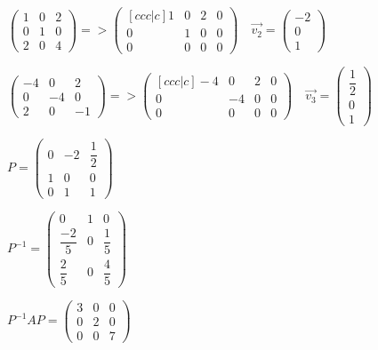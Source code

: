 \documentclass[12pt,letterpaper]{article}
\begin{document}
\begin{enumerate}[label=(\alph*)]
        $\begin{pmatrix} 1 & 0 & 2 \\ 0 & 1 & 0 \\ 2 & 0 & 4 \end{pmatrix} => 
                \begin{pmatrix}[ccc|c] 1 & 0 & 2 & 0 \\ 0 & 1 & 0 & 0 \\ 0 & 0 & 0 & 0 \end{pmatrix} \quad \vec{v_2} = \begin{pmatrix} -2 \\ 0 \\ 1 \end{pmatrix}$
                
         $\begin{pmatrix} -4 & 0 & 2 \\ 0 & -4 & 0 \\ 2 & 0 & -1 \end{pmatrix} => 
                \begin{pmatrix}[ccc|c] -4 & 0 & 2 & 0 \\ 0 & -4 & 0 & 0 \\ 0 & 0 & 0 & 0 \end{pmatrix} \quad \vec{v_3} = \begin{pmatrix} \dfrac{1}{2} \\ 0 \\ 1 \end{pmatrix}$
        
        $P = \begin{pmatrix} 0 & -2 & \dfrac{1}{2} \\ 1 & 0 & 0 \\ 0 & 1 & 1 \end{pmatrix}$
        
        $P^{-1} = \begin{pmatrix} 
            0 & 1 & 0 \\ 
            \dfrac{-2}{5} & 0 & \dfrac{1}{5} \\
            \dfrac{2}{5} & 0 & \dfrac{4}{5}
        \end{pmatrix}$
        
        $P^{-1}AP = 
        \begin{pmatrix} 
            3 & 0 & 0 \\ 
            0 & 2 & 0 \\
            0 & 0 & 7 
        \end{pmatrix}
        $
        

\end{enumerate}
\end{document}
